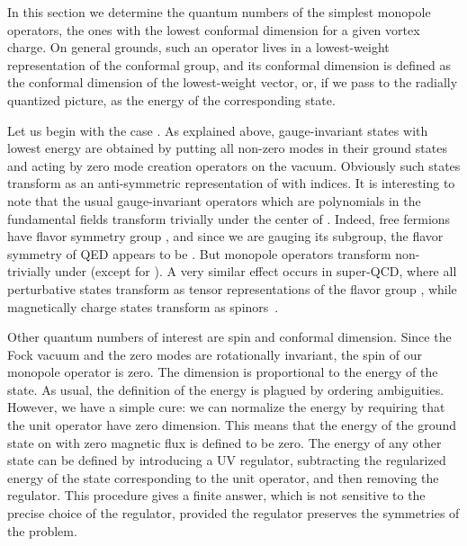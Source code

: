\documentclass[a4paper,12pt, amsfonts, amssymb]{article}
\providecommand{\ZZ}{{\mathbb Z}}
\begin{document}
In this section we determine the quantum numbers of the simplest
monopole operators, the ones with the lowest conformal dimension for a
given vortex charge.
On general grounds, such an operator lives in a lowest-weight representation
of the conformal group, and its conformal dimension is defined as the
conformal dimension of the lowest-weight vector, or, if we pass to the
radially quantized picture, as the energy of the corresponding state.

Let us begin with the case \coordHE{}.
As explained above, gauge-invariant states with lowest energy are obtained 
by putting all non-zero modes in their ground states and acting by \coordHE{} 
zero mode creation operators on the vacuum. Obviously such states
transform as an anti-symmetric representation of \coordHE{} with
\coordHE{} indices. It is interesting to note that the usual 
gauge-invariant operators which are polynomials in the fundamental
fields transform trivially under the center of \coordHE{}. Indeed,
free fermions have flavor symmetry group \coordHE{}, and since
we are gauging its \coordHE{} subgroup, the flavor symmetry of QED appears to be
\myHighlight{$U(N_f)/U(1)=PU(N_f)=SU(N_f)/\ZZ_{N_f}$}\coordHE{}. But monopole operators
transform non-trivially under \myHighlight{$\ZZ_{N_f}$}\coordHE{} (except for \coordHE{}).
A very similar effect occurs in \coordHE{}  \coordHE{} super-QCD, where all perturbative
states transform as tensor representations of the flavor group \coordHE{},
while magnetically charge states transform as spinors~\cite{SW2}.

Other quantum numbers of interest are spin and conformal dimension.
Since the Fock vacuum and the zero modes are rotationally invariant,
the spin of our monopole operator is zero. The dimension is proportional
to the energy of the state. As usual, the definition of the energy
is plagued by ordering ambiguities. However, we have a simple cure:
we can normalize the energy by requiring that the unit operator
have zero dimension. This means that the energy of the ground state
on \coordHE{} with zero magnetic flux is defined to be zero. 
The energy of any other state can be defined by introducing a UV
regulator, subtracting the regularized energy of the state corresponding
to the unit operator, and then removing the regulator. This procedure gives
a finite answer, which is not sensitive to the precise choice of the
regulator, provided the regulator preserves the symmetries of the
problem. 
\end{document}
